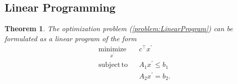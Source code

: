 \documentclass[a4paper, english, 11pt, onecolumn, oneside, final]{article}
\numberwithin{equation}{section}   %
\theoremstyle{plain}
\newtheorem{theorem}             {Theorem}[section]
\theoremstyle{definition}
\theoremstyle{remark}
\begin{document}
\subsection{Linear Programming}
\begin{theorem}
    The optimization problem (\ref{problem:LinearProgram}) can be formulated as a linear program of the form
    \begin{equation}
    \label{problem:LinearProgrammNew}
        \begin{aligned}
        & \underset{x^\prime}{\mathrm{minimize}} & & c^\top x^\prime\\
        & \mathrm{subject\,to} & & A_1x^\prime\leq b_1 \\
        & & & A_2x^\prime=b_2.
        \end{aligned}
    \end{equation}
\end{theorem}
\end{document}
